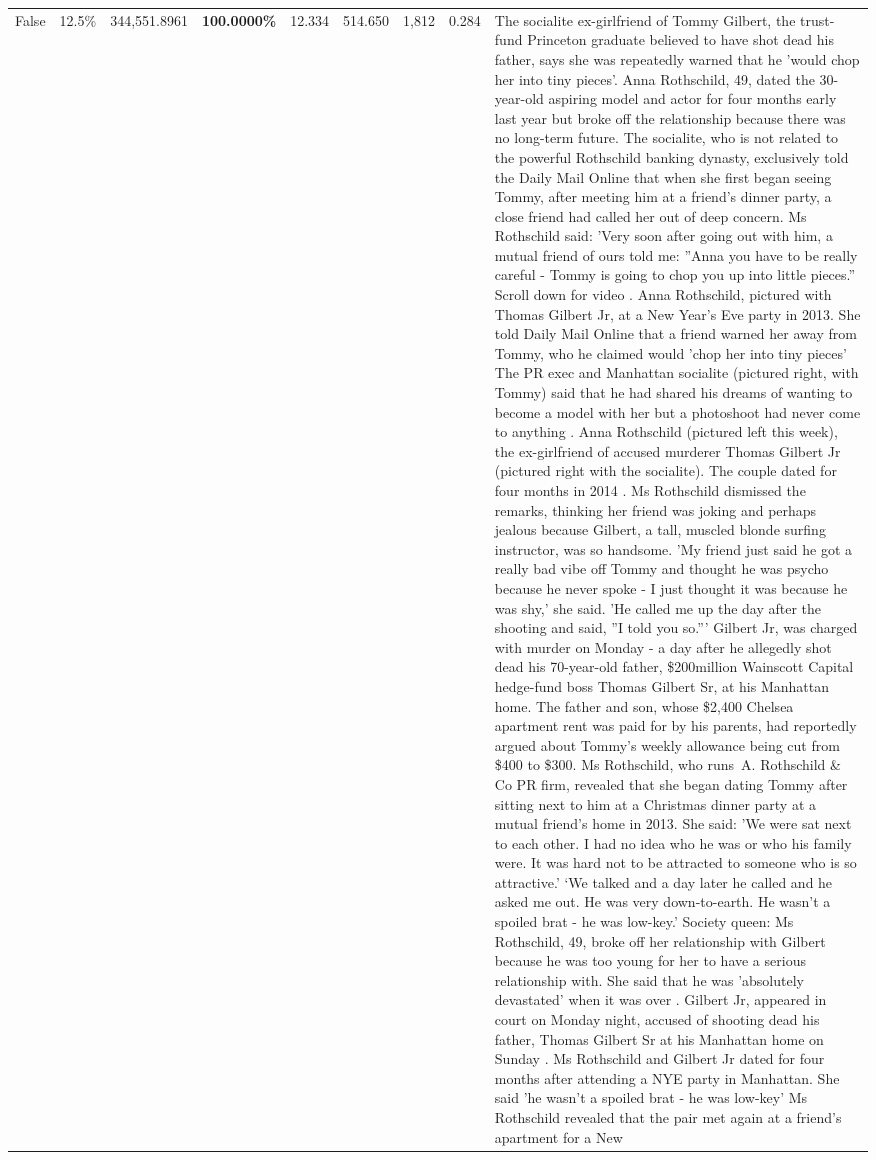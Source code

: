 \begin{table}[H]
\begin{tabular}{lllrlllll}
False & 12.5\% & 344,551.8961 & \bfseries \color{red} 100.0000\% & 12.334 & 514.650 & 1,812 & 0.284 & The socialite ex-girlfriend of Tommy Gilbert, the trust-fund Princeton graduate believed to have shot dead his father, says she was repeatedly warned that he 'would chop her into tiny pieces'. Anna Rothschild, 49, dated the 30-year-old aspiring model and actor for four months early last year but broke off the relationship because there was no long-term future. The socialite, who is not related to the powerful Rothschild banking dynasty, exclusively told the Daily Mail Online that when she first began seeing Tommy, after meeting him at a friend's dinner party, a close friend had called her out of deep concern. Ms Rothschild said: 'Very soon after going out with him, a mutual friend of ours told me: ''Anna you have to be really careful - Tommy is going to chop you up into little pieces.'' Scroll down for video . Anna Rothschild, pictured with Thomas Gilbert Jr, at a New Year's Eve party in 2013. She told Daily Mail Online that a friend warned her away from Tommy, who he claimed would 'chop her into tiny pieces' The PR exec and Manhattan socialite (pictured right, with Tommy) said that he had shared his dreams of wanting to become a model with her but a photoshoot had never come to anything . Anna Rothschild (pictured left this week), the ex-girlfriend of accused murderer Thomas Gilbert Jr (pictured right with the socialite). The couple dated for four months in 2014 . Ms Rothschild dismissed the remarks, thinking her friend was joking and perhaps jealous because Gilbert, a tall, muscled blonde surfing instructor, was so handsome. 'My friend just said he got a really bad vibe off Tommy and thought he was psycho because he never spoke - I just thought it was because he was shy,' she said. 'He called me up the day after the shooting and said, ''I told you so.''' Gilbert Jr, was charged with murder on Monday - a day after he allegedly shot dead his 70-year-old father, \$200million Wainscott Capital hedge-fund boss Thomas Gilbert Sr, at his Manhattan home. The father and son, whose \$2,400 Chelsea apartment rent was paid for by his parents, had reportedly argued about Tommy's weekly allowance being cut from \$400 to \$300. Ms Rothschild, who runs A. Rothschild \& Co PR firm, revealed that she began dating Tommy after sitting next to him at a Christmas dinner party at a mutual friend's home in 2013. She said: 'We were sat next to each other. I had no idea who he was or who his family were. It was hard not to be attracted to someone who is so attractive.' ‘We talked and a day later he called and he asked me out. He was very down-to-earth. He wasn’t a spoiled brat - he was low-key.’ Society queen: Ms Rothschild, 49, broke off her relationship with Gilbert because he was too young for her to have a serious relationship with. She said that he was 'absolutely devastated' when it was over . Gilbert Jr, appeared in court on Monday night, accused of shooting dead his father, Thomas Gilbert Sr at his Manhattan home on Sunday . Ms Rothschild and Gilbert Jr dated for four months after attending a NYE party in Manhattan. She said 'he wasn't a spoiled brat - he was low-key' Ms Rothschild revealed that the pair met again at a friend’s apartment for a New 
\end{tabular}
\end{table}
